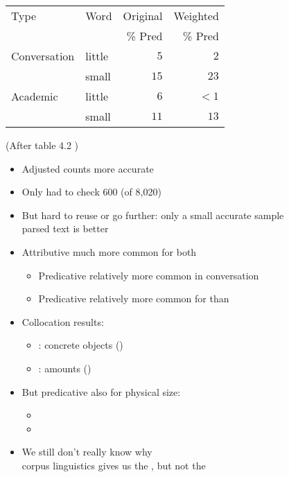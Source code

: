 \documentclass[a4paper,landscape,headrule,footrule,dvips]{foils}
\begin{document}
\begin{CJK}{UTF8}{min}
\begin{tabular}{llrr}
  Type & Word & Original & Weighted \\ 
  &  & \% Pred & \%  Pred \\ 
\hline\hline
Conversation & little & $5$ & $2$ \\
             & small &  $15$ & $23$ \\
\hline
Academic & little & $6$  & $<1$\\
           & small & $11$ & $13$ \\

\end{tabular}

(After table 4.2 \citep[p 93]{Biber:Conrad:Reppen:1998})

\begin{itemize}
\item Adjusted counts more accurate
\item Only had to check 600 (of 8,020)
\item But hard to reuse or go further: only a small accurate sample
  \\ parsed text is better
\end{itemize}


\begin{itemize}
\item Attributive much more common for both
  \begin{itemize}
  \item Predicative relatively more common in conversation
  \item Predicative relatively more common for  than 
  \end{itemize}
\item Collocation results:
  \begin{itemize}
  \item {}: concrete objects ()
  \item {}: amounts  ()
  \end{itemize}
\item But predicative  also for physical size:
  \begin{itemize}
  \item {}
  \item {}
  \end{itemize}
\item We still don't really know why \frownie
 \\ corpus linguistics gives us the , but not the 
\end{itemize}



\end{CJK}
\end{document}
